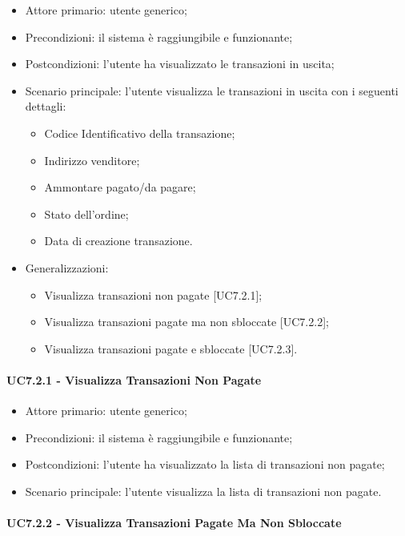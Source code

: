 \begin{itemize}
    \item Attore primario: utente generico;
    \item Precondizioni: il sistema è raggiungibile e funzionante;
    \item Postcondizioni: l'utente ha visualizzato le transazioni in uscita;
    \item Scenario principale: l'utente visualizza le transazioni in uscita con i seguenti dettagli:
        \begin{itemize}
            \item Codice Identificativo della transazione;
            \item Indirizzo venditore;
            \item Ammontare pagato/da pagare;
            \item Stato dell'ordine;
            \item Data di creazione transazione.
        \end{itemize}
    \item Generalizzazioni:
          \begin{itemize}
              \item Visualizza transazioni non pagate [UC7.2.1];
              \item Visualizza transazioni pagate ma non sbloccate [UC7.2.2];
              \item Visualizza transazioni pagate e sbloccate [UC7.2.3].
          \end{itemize}
\end{itemize}

\paragraph{UC7.2.1 - Visualizza Transazioni Non Pagate}

\begin{itemize}
    \item Attore primario: utente generico;
    \item Precondizioni: il sistema è raggiungibile e funzionante;
    \item Postcondizioni: l'utente ha visualizzato la lista di transazioni non pagate;
    \item Scenario principale: l'utente visualizza la lista di transazioni non pagate.
\end{itemize}

\paragraph{UC7.2.2 - Visualizza Transazioni Pagate Ma Non Sbloccate}

